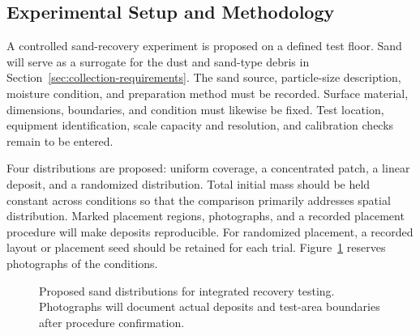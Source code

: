 \subsection{Experimental Setup and Methodology}
\label{sec:collection-method}
A controlled sand-recovery experiment is proposed on a defined test floor. Sand will serve as a surrogate for the dust and sand-type debris in Section~\ref{sec:collection-requirements}. The sand source, particle-size description, moisture condition, and preparation method must be recorded. Surface material, dimensions, boundaries, and condition must likewise be fixed. Test location, equipment identification, scale capacity and resolution, and calibration checks remain to be entered.

Four distributions are proposed: uniform coverage, a concentrated patch, a linear deposit, and a randomized distribution. Total initial mass should be held constant across conditions so that the comparison primarily addresses spatial distribution. Marked placement regions, photographs, and a recorded placement procedure will make deposits reproducible. For randomized placement, a recorded layout or placement seed should be retained for each trial. Figure~\ref{fig:collection-distributions} reserves photographs of the conditions.

\begin{figure}[htbp]\centering
{}\hfill
{}\par\medskip
{}\hfill
{}
\caption{Proposed sand distributions for integrated recovery testing. Photographs will document actual deposits and test-area boundaries after procedure confirmation.}
\label{fig:collection-distributions}
\end{figure}

